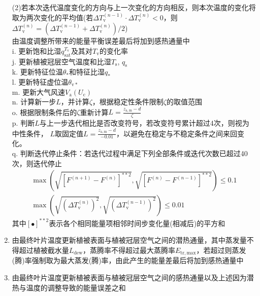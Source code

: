 \begin{enumerate}
    (2)若本次迭代温度变化的方向与上一次变化的方向相反，则本次温度的变化将取为两次变化的平均值(若$\Delta T_{\mathrm {v}} ^{\left(n-1\right)} \cdot \Delta T_{\mathrm {v}} ^{\left(n\right)}<0$，则$\Delta T_{\mathrm {v}} ^{\left(n\right)}=\left(\Delta T_{\mathrm {v}} ^{\left(n-1\right)}+\Delta T_{\mathrm {v}} ^{\left(n\right)}\right)/2$)\\
    由温度调整所带来的能量平衡误差最后将加到感热通量中\\
    i. 更新饱和比湿$q_{\mathrm{sat}}^{T_{\mathrm {v}} }$及其对$T_{\mathrm {v}} $的变化率 \\
    j. 更新植被冠层空气温度和比湿$T_{\mathrm {s}} $, $q_{\mathrm {s}} $ \\
    k. 更新特征位温$\theta_\ast$和特征比湿$q_\ast$ \\
    l. 更新特征虚位温$\theta_{\mathrm{v\ast}}$ \\
    m. 更新大气风速$V_{\mathrm {a}} \left(U_{\mathrm {c}} \right)$ \\
    n. 计算新一步$L$，并计算$\zeta$，根据稳定性条件限制$\zeta$的取值范围 \\
    o. 根据限制条件后的$\zeta$重新计算$L=\frac{z_{\mathrm{a,m}}-d}{\zeta}$ \\
    p. 判断$L$与上一步迭代相比是否改变符号，若改变符号累计超过4次，则视为中性条件，
    $L$取固定值$L=\frac{z_{\mathrm{a,m}}-d}{-0.01}$，以避免在稳定与不稳定条件之间来回变化。\\
    q. 判断迭代停止条件：若迭代过程中满足下列全部条件或迭代次数已超过40次，则迭代停止
    \begin{equation}
      \begin{array}{l}\max\left( \sqrt{\left[F^{(n+1)}-F^{(n)}\right]^{\ast\ast2}}, \sqrt{\left[F^{(n)}-F^{(n-1)}\right]^{\ast\ast2}} \right) \leqslant 0.1 \\[3.0 ex]
      \max\left( \sqrt{\left(\Delta T_{\mathrm{v}}^{(n)}\right)^{2}}, \sqrt{\left(\Delta T_{\mathrm{v}}^{(n-1)}\right)^{2}} \right) \leqslant 0.01\end{array}
    \end{equation}
    其中$\left[\bullet\right]^{\ast\ast2}$表示各个相同能量项相邻时间步变化量(相减后)的平方和
  \item 由最终叶片温度更新植被表面与植被冠层空气之间的潜热通量，其中蒸发量不得超过植被截水量$L_{\mathrm{dew}}$，蒸腾率不得超过最大蒸腾率$ E_{\mathrm{tr,max}}$，若超过则蒸发(腾)率强制取为最大蒸发(腾)率，由此产生的能量差最后将加到感热通量中
  \item 由最终叶片温度更新植被表面与植被冠层空气之间的感热通量以及上述因为潜热与温度的调整导致的能量误差之和

\end{enumerate}
